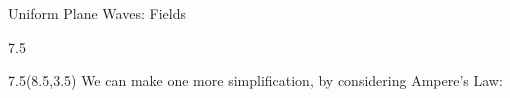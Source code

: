 \begin{lesson35}
\begin{frame}{Uniform Plane Waves: Fields}
\begin{textblock}{7.5}
\begin{myblock}[0.9]{}
\begin{small}
\end{small}
\end{myblock}
\end{textblock}


\begin{textblock}{7.5}(8.5,3.5)
We can make one more simplification, by considering Ampere's Law:
\begin{small}
\end{small}

\begin{myblock}[0.9]{}
\begin{small}
\end{small}
\end{myblock}
\end{textblock}
\end{frame}


\end{lesson35}
